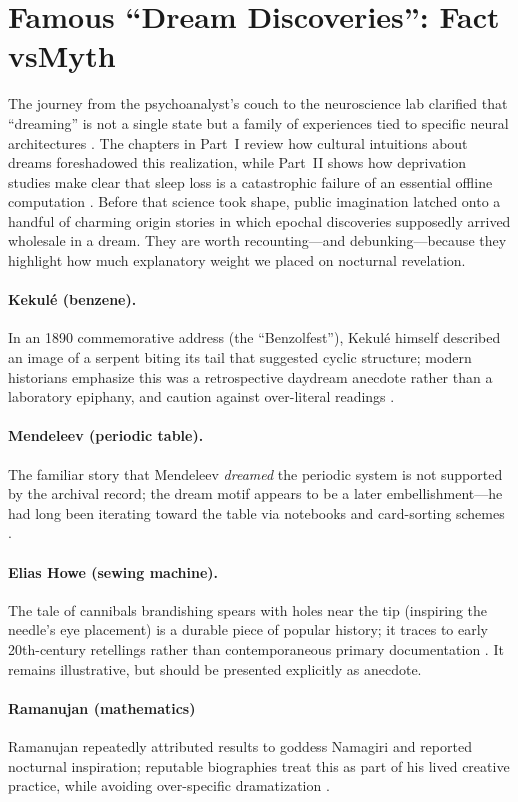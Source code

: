 \section{Famous ``Dream Discoveries'': Fact vs\. Myth}\label{sec:famous_eurekas}

The journey from the psychoanalyst's couch to the neuroscience lab clarified that ``dreaming'' is not a single state but a family of experiences tied to specific neural architectures \citep{revonsuo2013important}. The chapters in Part~I review how cultural intuitions about dreams foreshadowed this realization, while Part~II shows how deprivation studies make clear that sleep loss is a catastrophic failure of an essential offline computation \citep{wilson1994reactivation, waters2018deprivation}. Before that science took shape, public imagination latched onto a handful of charming origin stories in which epochal discoveries supposedly arrived wholesale in a dream. They are worth recounting---and debunking---because they highlight how much explanatory weight we placed on nocturnal revelation.

\paragraph{Kekul\'e (benzene).}
In an 1890 commemorative address (the “Benzolfest”), Kekul\'e himself described an image of a serpent biting its tail that suggested cyclic structure; modern historians emphasize this was a retrospective daydream anecdote rather than a laboratory epiphany, and caution against over-literal readings \citep{benfey1958, rocke2010}.

\paragraph{Mendeleev (periodic table).}
The familiar story that Mendeleev \emph{dreamed} the periodic system is not supported by the archival record; the dream motif appears to be a later embellishment---he had long been iterating toward the table via notebooks and card-sorting schemes \citep{gordin2004}.

\paragraph{Elias Howe (sewing machine).}
The tale of cannibals brandishing spears with holes near the tip (inspiring the needle’s eye placement) is a durable piece of popular history; it traces to early 20th-century retellings rather than contemporaneous primary documentation \citep{kaempffert1924}. It remains illustrative, but should be presented explicitly as anecdote.

\paragraph{Ramanujan (mathematics)}
Ramanujan repeatedly attributed results to goddess Namagiri and reported nocturnal inspiration; reputable biographies treat this as part of his lived creative practice, while avoiding over-specific dramatization \citep{kanigel1991}.
